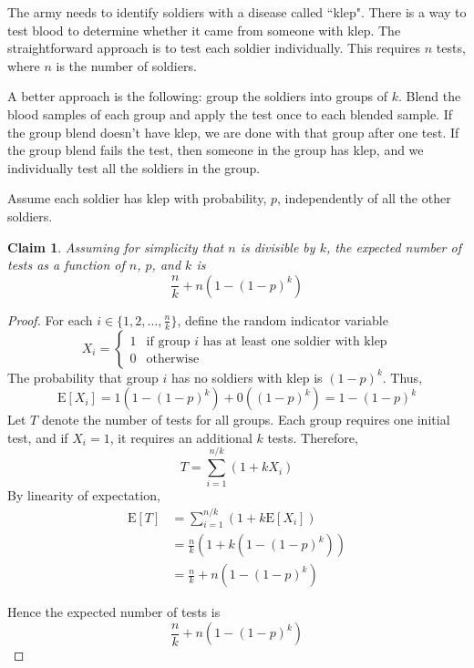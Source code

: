 \documentclass{article}
\newtheorem{claim}{Claim}
\begin{document}
The army needs to identify soldiers with a disease called ``klep". There is a way to test blood to determine 
whether it came from someone with klep. The straightforward approach is to test each soldier individually. 
This requires $n$ tests, where $n$ is the number of soldiers. 

\medskip

A better approach is the following: group the soldiers into groups of $k$. Blend the blood samples of each 
group and apply the test once to each blended sample. If the group blend doesn't have klep, we are done with 
that group after one test. If the group blend fails the test, then someone in the group has klep, and we 
individually test all the soldiers in the group.

\medskip

Assume each soldier has klep with probability, $p$, independently of all the other soldiers.

\begin{claim}
    Assuming for simplicity that $n$ is divisible by $k$, the expected number of tests as a function of $n$, 
    $p$, and $k$ is
    \[
    \frac{n}{k} + n(1 - (1-p)^k)
    \]
\end{claim}

\begin{proof}
    For each $i \in \{1, 2, \dots, \frac{n}{k}\}$, define the random indicator variable
    \[
    X_i =
    \begin{cases}
        1 & \text{if group } i \text{ has at least one soldier with klep} \\
        0 & \text{otherwise}
    \end{cases}
    \]
    The probability that group $i$ has no soldiers with klep is $(1-p)^k$. Thus,
    \[
    \mathrm{E}[X_i] = 1\left(1 - (1-p)^k\right) + 0\left((1-p)^k\right) = 1 - (1-p)^k
    \]
    Let $T$ denote the number of tests for all groups. Each group requires one initial test, and if $X_i = 1$, 
    it requires an additional $k$ tests. Therefore,
    \[
    T = \sum_{i=1}^{n/k}(1 + kX_i)
    \]
    By linearity of expectation,
    \[
    \begin{aligned}
        \mathrm{E}[T] &= \sum_{i=1}^{n/k}\left(1 + k\mathrm{E}[X_i]\right) \\[4pt]
        &= \frac{n}{k}\left(1 + k\left(1 - (1-p)^k\right)\right) \\[4pt]
        &= \frac{n}{k} + n(1 - (1-p)^k)
    \end{aligned}
    \]

    \medskip

    Hence the expected number of tests is 
    \[
    \frac{n}{k} + n(1 - (1-p)^k)
    \]
\end{proof}
\end{document}
